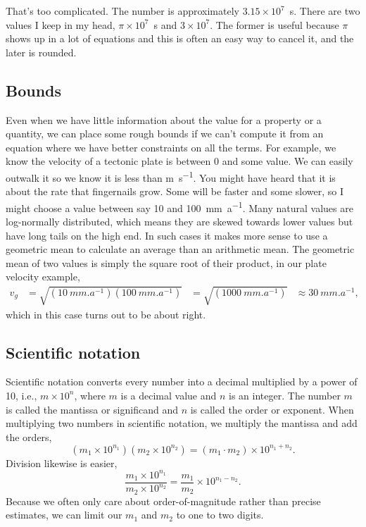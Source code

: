 \begin{activity}
That's too complicated.  The number is approximately $3.15\times10^{7}$~\si{s}.  There are two values I keep in my head, $\pi \times 10^{7}$~\si{s} and $3\times10^{7}$.  The former is useful because $\pi$ shows up in a lot of equations and this is often an easy way to cancel it, and the later is rounded.

\subsection{Bounds}
Even when we have little information about the value for a property or a quantity, we can place some rough bounds if we can't compute it from an equation where we have better constraints on all the terms.  For example, we know the velocity of a tectonic plate is between 0 and some value.  We can easily outwalk it so we know it is less than \si{m.s^{-1}}.  You might have heard that it is about the rate that fingernails grow.  Some will be faster and some slower, so I might choose a value between say 10 and 100~\si{mm.a^{-1}}. Many natural values are log-normally distributed, which means they are skewed towards lower values but have long tails on the high end.  In such cases it makes more sense to use a geometric mean to calculate an average than an arithmetic mean.  The geometric mean of two values is simply the square root of their product, in our plate velocity example,
\begin{align*}
    v_g &= \sqrt{(\SI{10}{mm.a^{-1}})(\SI{100}{mm.a^{-1}})}
    &= \sqrt{(\SI{1000}{mm.a^{-1}})}
    &\approx \SI{30}{mm.a^{-1}} ,
\end{align*}
which in this case turns out to be about right.

\subsection{Scientific notation}
Scientific notation converts every number into a decimal multiplied by a power of 10, i.e., $m \times 10^{n}$, where $m$ is a decimal value and $n$ is an integer.  The number $m$ is called the mantissa or significand and $n$ is called the order or exponent.  When multiplying two numbers in scientific notation, we multiply the mantissa and add the orders,
\[
    (m_1 \times 10^{n_1}) (m_2 \times 10^{n_2}) = 
    (m_1 \cdot m_2) \times 10^{n_1 + n_2}\! .
\]
Division likewise is easier,
\[
    \frac{m_1 \times 10^{n_1}} {m_2 \times 10^{n_2}} = 
    \frac{m_1}{m_2} \times 10^{n_1 - n_2}\! .
\]
Because we often only care about order-of-magnitude rather than precise estimates, we can limit our $m_1$ and $m_2$ to one to two digits.


\end{activity}

